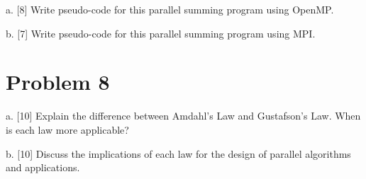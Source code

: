 \documentclass{article}
\begin{document}
a. [8]  Write pseudo-code for this parallel summing program using OpenMP.

b. [7]  Write pseudo-code for this parallel summing program using MPI.


\section*{Problem 8}
a. [10] Explain the difference between Amdahl's Law and Gustafson's Law.  When is each law more applicable?

b. [10]  Discuss the implications of each law for the design of parallel algorithms and applications.
\end{document}
